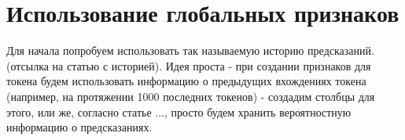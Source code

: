 \section{Использование глобальных признаков}

Для начала попробуем использовать так называемую историю предсказаний. (отсылка на статью с историей). Идея проста - при создании признаков для токена будем использовать информацию о предыдущих вхождениях токена (например, на протяжении 1000 последних токенов) - создадим столбцы для этого, или же, согласно статье ..., просто будем хранить вероятностную информацию о предсказаниях.


